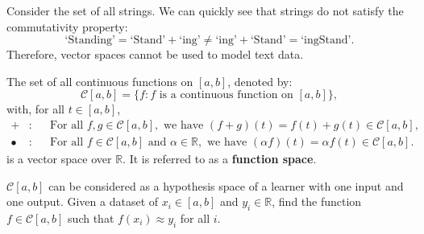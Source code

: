 \documentclass{huhtakm-template-book-v2}
\begin{document}
    \begin{eg}
        Consider the set of all strings. We can quickly see that strings do not satisfy the commutativity property:
        \begin{equation*}
            \text{`Standing'} = \text{`Stand'} + \text{`ing'} \neq \text{`ing'} + \text{`Stand'} = \text{`ingStand'}.
        \end{equation*}
        Therefore, vector spaces cannot be used to model text data.
    \end{eg}
    \newpage
    
    \begin{eg}
        The set of all continuous functions on $[a, b]$, denoted by:
        \begin{equation*}
            \mathcal{C}[a, b] = \{f : f \text{ is a continuous function on } [a, b]\},
        \end{equation*}
        with, for all $t \in [a, b]$,
        \begin{align*}
            +&: & &\text{For all } f, g \in \mathcal{C}[a, b], \text{ we have } (f + g)(t) = f(t) + g(t) \in \mathcal{C}[a, b],\\
            \bullet&: & &\text{For all } f \in \mathcal{C}[a, b] \text{ and } \alpha \in \mathbb{R}, \text{ we have } (\alpha f)(t) = \alpha f(t) \in \mathcal{C}[a, b].
        \end{align*}
        is a vector space over $\mathbb{R}$. It is referred to as a \textbf{function space}.
    \end{eg}
    \begin{rem}
        $\mathcal{C}[a, b]$ can be considered as a hypothesis space of a learner with one input and one output. Given a dataset of $x_{i} \in [a, b]$ and $y_{i} \in \mathbb{R}$, find the function $f \in \mathcal{C}[a, b]$ such that $f(x_{i}) \approx y_{i}$ for all $i$.
    \end{rem}
\end{document}
